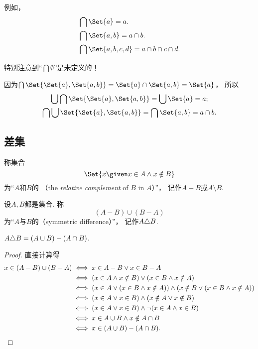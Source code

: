 例如，
\begin{align*}
	&\bigcap\Set{a} = a. \\
	&\bigcap\Set{a,b} = a \cap b. \\
	&\bigcap\Set{a,b,c,d} = a \cap b \cap c \cap d.
\end{align*}

\begin{remark}
特别注意到“\(\bigcap\emptyset\)”是未定义的！
\end{remark}

\begin{example}
因为\(\bigcap\Set{ \Set{a}, \Set{a,b} } = \Set{a} \cap \Set{a,b} = \Set{a}\)，
所以\begin{gather*}
	\bigcup \bigcap \Set{ \Set{a}, \Set{a,b} } = \bigcup \Set{a} = a; \\
	\bigcap \bigcup \Set{ \Set{a}, \Set{a,b} } = \bigcap \Set{a,b} = a \cap b.
\end{gather*}
\end{example}

\subsection{差集}
\begin{definition}
称集合\begin{equation*}
	\Set{ x \given x \in A \land x \notin B }
\end{equation*}为“\(A\)和\(B\)的%
（the \emph{relative complement} of \(B\) in \(A\)）”，
记作\(A - B\)或\(A \setminus B\).
\end{definition}

\begin{definition}
设\(A,B\)都是集合.
称\begin{equation*}
	(A-B)\cup(B-A)
\end{equation*}为“\(A\)与\(B\)的（symmetric difference）”，
记作\(A \triangle B\).
\end{definition}

\begin{theorem}
\(A \triangle B = (A \cup B)-(A \cap B)\).
\begin{proof}
直接计算得
\begin{align*}
	x\in(A-B)\cup(B-A)
	&\iff x \in A-B \lor x \in B-A \\
	&\iff (x \in A \land x \notin B) \lor (x \in B \land x \notin A) \\
	&\iff (x \in A \lor (x \in B \land x \notin A)) \land (x \notin B \lor (x \in B \land x \notin A)) \\
	&\iff (x \in A \lor x \in B) \land (x \notin A \lor x \notin B) \\
	&\iff (x \in A \lor x \in B) \land \neg(x \in A \land x \in B) \\
	&\iff x \in A \cup B \land x \notin A \cap B \\
	&\iff x\in(A \cup B)-(A \cap B).
	\qedhere
\end{align*}
\end{proof}
\end{theorem}

